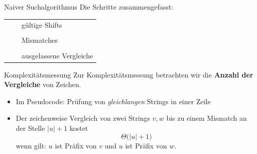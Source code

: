 \documentclass[xcolor=dvipsnames, aspectratio=169]{beamer}
\begin{document}
\begin{frame}{Naiver Suchalgorithmus}
Die Schritte zusammengefasst:\bigskip

\begin{minipage}{.9\textwidth}
\begin{table}\setlength\extrarowheight{.3em}
\caption{Naiver Algorithmus, Beispiel}
\end{table}
\end{minipage}
\hspace{-4em}
\begin{minipage}{0.05\textwidth}
\tiny\vspace{-4em}
\begin{tabular}{cl}
\cellcolor{markgreen}~~& gültige Shifts\\\\[-.5em]
\cellcolor{red}~~& Mismatches\\\\[-.5em]
\cellcolor{lightgray}~~& ausgelassene Vergleiche
\end{tabular}
\end{minipage}
\end{frame}

\begin{frame}[<+->]{Komplexitätsmessung}
Zur Komplexitätsmessung betrachten wir die \textbf{Anzahl der Vergleiche} von Zeichen.\bigskip

\begin{itemize}
\item Im Pseudocode: Prüfung von \emph{gleichlangen} Strings in einer Zeile\bigskip
\item Der zeichenweise Vergleich von zwei Strings $v,w$ bis zu einem Mismatch an der Stelle $\vert u\vert +1$ kostet \[\Theta\big(\vert u\vert +1\big)\] wenn gilt: $u$ ist Präfix von $v$ und  $u$ ist Präfix von $w$.
\end{itemize}
\end{frame}
\end{document}
